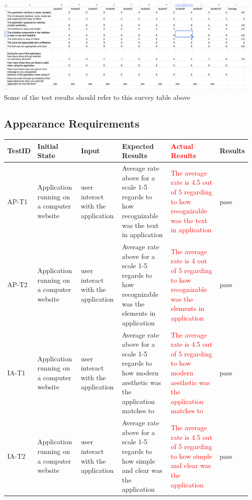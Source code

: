 \documentclass[12pt, oneside, openany, titlepage]{article}
\begin{document}
\hspace{-3cm}
\includegraphics[scale=0.4]{VnVReport/user_survey.png}
Some of the test results should refer to this survey table above
\newpage
\subsection{Appearance Requirements}
\begin{tabular}{ |p{1.5cm}| p{2cm} |p{2cm}| p{4cm}|p{3cm}|p{1.5cm}|  } 
 \hline
 TestID & Initial State & Input & Expected Results & \textcolor{red}{Actual Results} & Results\\ 
 \hline
 AP-T1 & Application running on a computer website & user interact with the application & Average rate above for a scale 1-5 regards to how recognizable was the text in application  &\textcolor{red}{The average rate is 4.5 out of 5 regarding to how recognizable was the text in application} &pass\\
  \hline
 AP-T2 & Application running on a computer website & user interact with the application & Average rate above for a scale 1-5 regards to how recognizable was the elements in application  &\textcolor{red}{The average rate is 4 out of 5 regarding to how recognizable was the elements in application} &pass\\
  \hline
 IA-T1 & Application running on a computer website & user interact with the application & Average rate above for a scale 1-5 regards to how modern aesthetic was the application matches to &\textcolor{red}{The average rate is 4.5 out of 5 regarding to how modern aesthetic was the application matches to}& pass\\
   \hline
 IA-T2 & Application running on a computer website & user interact with the application & Average rate above for a scale 1-5 regards to how simple and clear was the application &\textcolor{red}{The average rate is 4.5 out of 5 regarding to how simple and clear was the application}& pass\\
 \hline
 \end{tabular}
\end{document}

